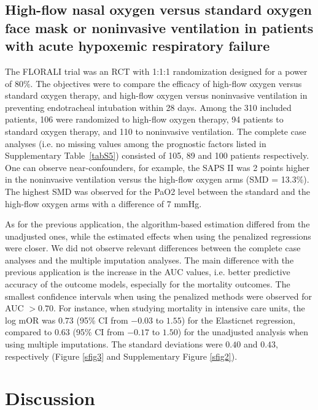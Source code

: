 \documentclass{article}
\begin{document}
\subsection{High-flow nasal oxygen versus standard oxygen face mask or noninvasive ventilation in patients with acute hypoxemic respiratory failure}

The FLORALI trial was an RCT with 1:1:1 randomization designed for a power of 80\%.  \cite{frat_high-flow_2015} The objectives were to compare the efficacy of high-flow oxygen versus standard oxygen therapy, and high-flow oxygen versus noninvasive ventilation in preventing endotracheal intubation within 28 days.
Among the 310 included patients,  106 were randomized to high-flow oxygen therapy, 94 patients to standard oxygen therapy, and 110 to noninvasive ventilation. The complete case analyses (i.e. no missing values among the prognostic factors listed in Supplementary Table~\ref{tabS5}) consisted of 105, 89 and 100 patients respectively. One can observe near-confounders, for example, the SAPS II was 2 points higher in the noninvasive ventilation versus the high-flow oxygen arms (SMD = 13.3\%). The highest SMD was observed for the PaO2 level between the standard and the high-flow oxygen arms with a difference of 7 mmHg.

As for the previous application, the algorithm-based estimation differed from the unadjusted ones, while the estimated effects when using the penalized regressions were closer. We did not observe relevant differences between the complete case analyses and the multiple imputation analyses.
The main difference with the previous application is the increase in the AUC values, i.e. better predictive accuracy of the outcome models, especially for the mortality outcomes. The smallest confidence intervals when using the penalized methods were observed for AUC $>0.70$. For instance, when studying mortality in intensive care units, the log mOR was $0.73$ (95\% CI from $-0.03$ to $1.55$) for the Elasticnet regression, compared to $0.63$ (95\% CI from $-0.17$ to $1.50$) for the unadjusted analysis when using multiple imputations. The standard deviations were $0.40$ and $0.43$, respectively (Figure \ref{sfig3} and Supplementary Figure \ref{sfig2}). 




\section{Discussion}
\end{document}
